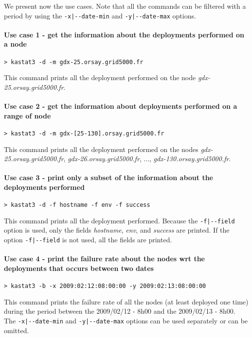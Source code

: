\documentclass[a4wide,10pt,oneside]{book}
\begin{document}
We present now the use cases. Note that all the commands can be filtered with a period by using the \texttt{-x|-{}-date-min} and \texttt{-y|-{}-date-max} options.
\paragraph{Use case 1 - get the information about the deployments performed on a node}
\begin{verbatim}
> kastat3 -d -m gdx-25.orsay.grid5000.fr
\end{verbatim}
This command prints all the deployment performed on the node \textit{gdx-25.orsay.grid5000.fr}.

\paragraph{Use case 2 - get the information about deployments performed on a range of node}
\begin{verbatim}
> kastat3 -d -m gdx-[25-130].orsay.grid5000.fr
\end{verbatim}
This command prints all the deployment performed on the nodes \textit{gdx-25.orsay.grid5000.fr}, \textit{gdx-26.orsay.grid5000.fr}, ..., \textit{gdx-130.orsay.grid5000.fr}.

\paragraph{Use case 3 - print only a subset of the information about the deployments performed}
\begin{verbatim}
> kastat3 -d -f hostname -f env -f success
\end{verbatim}
This command prints all the deployment performed. Because the \texttt{-f|-{}-field} option is used, only the fields \textit{hostname}, \textit{env}, and \textit{success} are printed. If the option \texttt{-f|-{}-field} is not used, all the fields are printed.

\paragraph{Use case 4 - print the failure rate about the nodes wrt the deployments that occurs between two dates}
\begin{verbatim}
> kastat3 -b -x 2009:02:12:08:00:00 -y 2009:02:13:08:00:00
\end{verbatim}
This command prints the failure rate of all the nodes (at least deployed one time) during the period between the 2009/02/12 - 8h00 and the 2009/02/13 - 8h00. The \texttt{-x|-{}-date-min} and \texttt{-y|-{}-date-max} options can be used separately or can be omitted.
\end{document}
